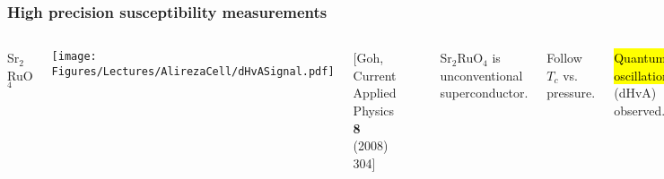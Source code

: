\begin{frame}[label=DACdHvA]
\frametitle{High precision susceptibility measurements}
\begin{columns}[t]

\centerline{Sr$_2$RuO$_4$}
 {\centerline{\texttt{[image: \\Figures/Lectures/AlirezaCell/dHvASignal.pdf]}}}

\centerline{\scriptsize [Goh, Current Applied Physics {\bf 8} (2008) 304]}

\centerline{~}
\bi
\item<1-> Sr$_2$RuO$_4$ is unconventional superconductor.
\item<1-> Follow $T_c$ vs. pressure.
\item<2-> \hl{Quantum oscillations} (dHvA) observed.
\item<2-> Evolution of Fermi surface and effective masses with pressure.
\ei
 
\end{columns}
\end{frame}

